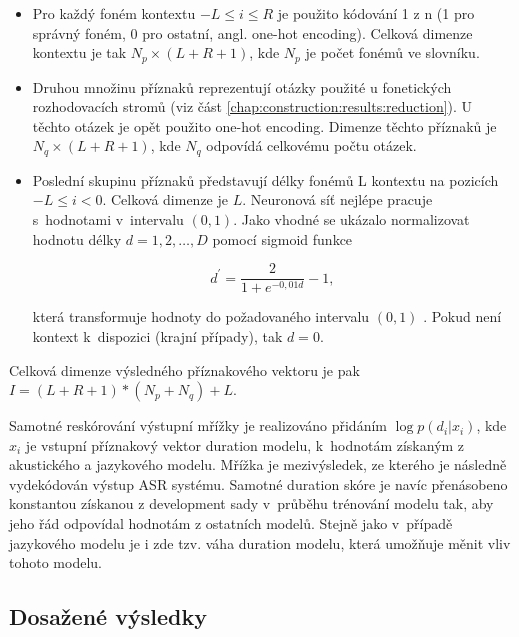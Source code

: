 \begin{itemize}
  \item Pro každý foném kontextu $-L \leq i \leq R$ je použito kódování 1 z n (1 pro správný foném, 0 pro ostatní, angl. one-hot encoding). Celková dimenze kontextu je tak $N_{p} \times \left(L + R + 1\right)$, kde $N_{p}$ je počet fonémů ve slovníku.
  \item Druhou množinu příznaků reprezentují otázky použité u fonetických rozhodovacích stromů (viz část \ref{chap:construction:results:reduction}). U těchto otázek je opět použito one-hot encoding. Dimenze těchto příznaků je $N_{q} \times \left(L + R + 1\right)$, kde $N_{q}$ odpovídá celkovému počtu otázek.
  \item Poslední skupinu příznaků představují délky fonémů L kontextu na pozicích $-L \leq i < 0$. Celková dimenze je $L$. Neuronová síť nejlépe pracuje s~hodnotami v~intervalu $\left(0, 1\right)$. Jako vhodné se ukázalo normalizovat hodnotu délky $d=1, 2, \dots, D$ pomocí sigmoid funkce

  \begin{equation}
    d^{\prime} = \frac{2}{1 + e^{-0,01d}} - 1,
    \label{eq:realisation:durationmodels:nn:normalization}
  \end{equation}

  \noindent která transformuje hodnoty do požadovaného intervalu $\left(0, 1\right)$ \cite{Alumae2014}. Pokud není kontext  k~dispozici (krajní případy), tak $d = 0$.
\end{itemize}

\noindent Celková dimenze výsledného příznakového vektoru je pak $I = \left(L + R + 1\right) \ast \left(N_{p} + N_{q}\right) + L$.

Samotné reskórování výstupní mřížky je realizováno přidáním $\log p\left(d_{i}| x_{i}\right)$, kde $x_{i}$ je vstupní příznakový vektor duration modelu,  k~hodnotám získaným z akustického a jazykového modelu. Mřížka je mezivýsledek, ze kterého je následně vydekódován výstup ASR systému. Samotné duration skóre je navíc přenásobeno konstantou získanou z development sady v~průběhu trénování modelu tak, aby jeho řád odpovídal hodnotám z ostatních modelů. \cite{Hadian2017} Stejně jako v~případě jazykového modelu je i zde tzv. váha duration modelu, která umožňuje měnit vliv tohoto modelu.

\subsection{Dosažené výsledky}
\label{chap:realisation:durationmodels:nn:softmax:results}

